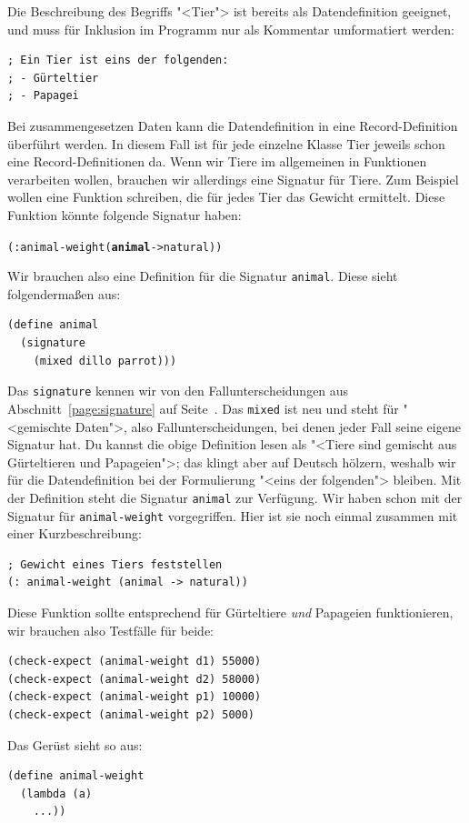 Die Beschreibung des Begriffs "<Tier"> ist bereits als Datendefinition
geeignet, und muss für Inklusion im Programm nur als Kommentar
umformatiert werden:
%
\begin{verbatim}
; Ein Tier ist eins der folgenden:
; - Gürteltier
; - Papagei
\end{verbatim}
%
Bei zusammengesetzen Daten kann die Datendefinition in eine
Record-Definition überführt werden.  In diesem Fall ist für jede
einzelne Klasse
Tier jeweils schon eine Record-Definitionen da.  Wenn wir Tiere im
allgemeinen in
Funktionen verarbeiten wollen, brauchen wir allerdings eine Signatur
für Tiere.  Zum Beispiel wollen eine Funktion schreiben, die für jedes
Tier das Gewicht ermittelt.  Diese Funktion könnte folgende Signatur haben:
%
\begin{alltt}
(: animal-weight (\textbf{animal} -> natural))
\end{alltt}
%
Wir brauchen also eine Definition für die Signatur \texttt{animal}.
Diese sieht folgendermaßen aus:
%
\begin{verbatim}
(define animal
  (signature
    (mixed dillo parrot)))
\end{verbatim}
%
Das \texttt{signature} kennen wir von den Fallunterscheidungen aus
Abschnitt~\ref{page:signature} auf Seite~\pageref{page:signature}.
Das \texttt{mixed} ist neu und steht
für "<gemischte Daten">, also Fallunterscheidungen, bei denen jeder
Fall seine eigene Signatur hat.  Du kannst die obige Definition lesen als
"<Tiere sind gemischt aus Gürteltieren und Papageien">; das klingt
aber auf Deutsch hölzern, weshalb wir für die Datendefinition bei der
Formulierung "<eins der folgenden"> bleiben.  Mit der Definition steht
die Signatur \texttt{animal} zur Verfügung.  Wir haben schon mit der
Signatur für \texttt{animal-weight} vorgegriffen.  Hier ist sie noch
einmal zusammen mit einer Kurzbeschreibung:
%
\begin{verbatim}
; Gewicht eines Tiers feststellen
(: animal-weight (animal -> natural))
\end{verbatim}
%
Diese Funktion sollte entsprechend für Gürteltiere \emph{und}
Papageien funktionieren, wir brauchen also Testfälle für beide:
%
\begin{verbatim}
(check-expect (animal-weight d1) 55000)
(check-expect (animal-weight d2) 58000)
(check-expect (animal-weight p1) 10000)
(check-expect (animal-weight p2) 5000)
\end{verbatim}
%
Das Gerüst sieht so aus:
%
\begin{verbatim}
(define animal-weight
  (lambda (a)
    ...))
\end{verbatim}
